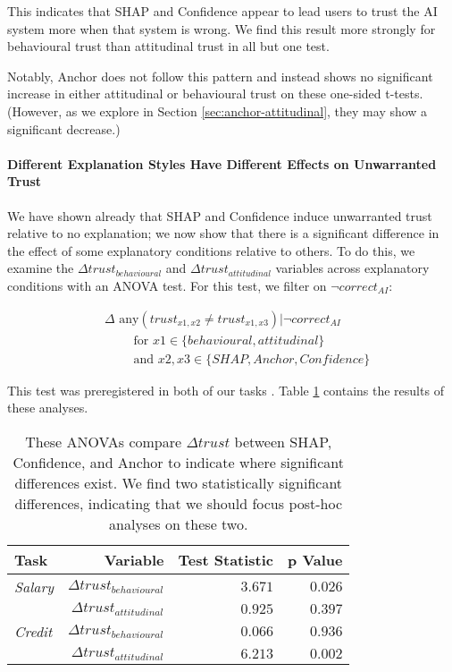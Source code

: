 This indicates that SHAP and Confidence appear to lead users to trust the AI system more when that system is wrong. We find this result more strongly for behavioural trust than attitudinal trust in all but one test.

Notably, Anchor does not follow this pattern and instead shows no significant increase in either attitudinal or behavioural trust on these one-sided t-tests. (However, as we explore in Section \ref{sec:anchor-attitudinal}, they may show a significant decrease.)

\paragraph{Different Explanation Styles Have Different Effects on Unwarranted Trust}
We have shown already that SHAP and Confidence induce unwarranted trust relative to no explanation; we now show that there is a significant difference in the effect of some explanatory conditions relative to others. To do this, we examine the $\Delta trust_{behavioural}$ and $\Delta trust_{attitudinal}$ variables across explanatory conditions with an ANOVA test. For this test, we filter on $\neg correct_{AI}$: 

\begin{equation}
\label{eq:different}
    \begin{split}
        & \Delta \text{ any} (trust_{x1,x2} \neq trust_{x1,x3}) | \neg correct_{AI} \\
        & \qquad \text{ for } x1 \in \{behavioural, attitudinal\} \\
        & \qquad \text{ and } x2,x3 \in \{SHAP, Anchor, Confidence\}
    \end{split}
\end{equation}

\noindent This test was preregistered in both of our tasks \cite{natarajan_binns_2022}. Table \ref{tab:delta-trust-anova} contains the results of these analyses.

\begin{table}[htb]
    \centering
    \caption{These ANOVAs compare $\Delta trust$ between SHAP, Confidence, and Anchor to indicate where significant differences exist. We find two statistically significant differences, indicating that we should focus post-hoc analyses on these two.}
    \label{tab:delta-trust-anova}
    \begin{tabular}{lrrr}
        \toprule
        Task & Variable & Test Statistic & p Value \\
        \midrule
        \emph{Salary} & $\Delta trust_{behavioural}$ & $\mathbf{3.671}$ & $\mathbf{0.026}$ \\
        & $\Delta trust_{attitudinal}$ & $0.925$ & $0.397$ \\
        \midrule
        \emph{Credit} & $\Delta trust_{behavioural}$ & $0.066$ & $0.936$ \\
        & $\Delta trust_{attitudinal}$ & $\mathbf{6.213}$ & $\mathbf{0.002}$ \\
        \bottomrule
    \end{tabular}
\end{table}

